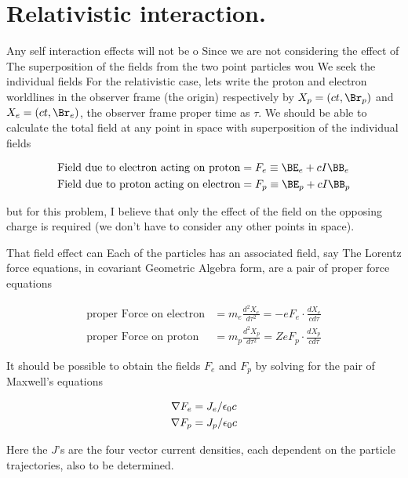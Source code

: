 \section{Relativistic interaction.}

Any self interaction effects will not be o
Since we are not considering the effect of 
The superposition of the fields from the two point particles wou
We seek the individual fields 
For the relativistic case, lets write the proton and electron worldlines in the observer frame (the origin) respectively by $X_p = (ct, \Br_p)$ and $X_e = (ct,\Br_e)$, the observer frame proper time as $\tau$.  We should be able to calculate the total field at any point in space with superposition of the individual fields

\begin{align}\label{eqn:nuclearInteraction:hoo3}
\text{Field due to electron acting on proton} &= F_e \equiv \BE_e + c I\BB_e \\
\text{Field due to proton acting on electron} &= F_p \equiv \BE_p + c I\BB_p
\end{align}

but for this problem, I believe that only the effect of the field on the opposing charge is required (we don't have to consider any other points in space).

That field effect 
can Each of the particles has an associated field, say
The Lorentz force equations, in covariant Geometric Algebra form, are a pair of proper force equations

\begin{align}\label{eqn:nuclearInteraction:hoo6}
\text{proper Force on electron} &= m_e \frac{d^2 X_e}{d\tau^2} = - e F_e \cdot \frac{d X_e}{c d\tau} \\
\text{proper Force on proton} &= m_p \frac{d^2 X_p}{d\tau^2} = Z e F_p \cdot \frac{d X_p}{c d\tau}
\end{align}


It should be possible to obtain the fields $F_e$ and $F_p$ by solving for the pair of Maxwell's equations

\begin{align}\label{eqn:nuclearInteraction:hoo4}
\nabla F_e &= J_e/\epsilon_0 c \\
\nabla F_p &= J_p/\epsilon_0 c
\end{align}

Here the $J$'s are the four vector current densities, each dependent on the particle trajectories, also to be determined.


